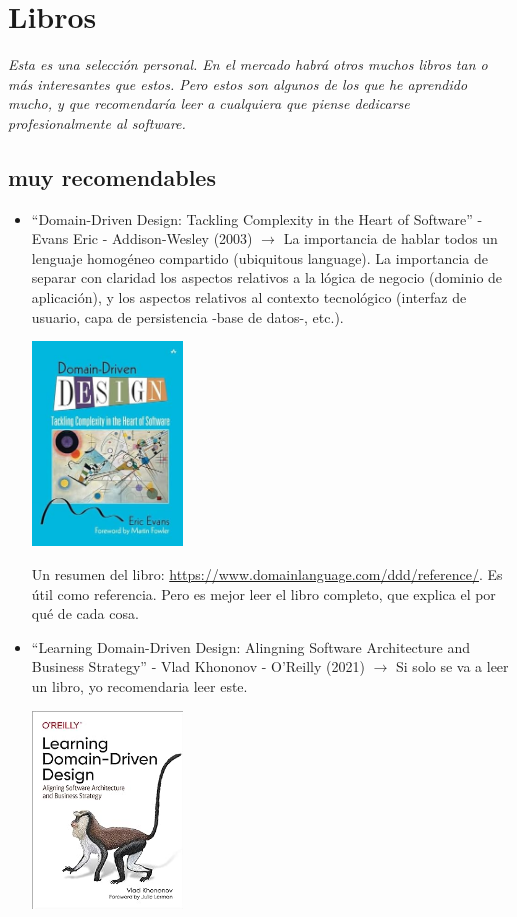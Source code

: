 \documentclass[spanish,12pt,a4paper,final,oneside]{book}
\begin{document}
\chapter{Libros}
\textit{Esta es una selección personal. En el mercado habrá otros muchos libros tan o más interesantes que estos. Pero estos son algunos de los que he aprendido mucho, y que recomendaría leer a cualquiera que piense dedicarse profesionalmente al software.}

\section{muy recomendables}

\begin{itemize}

\item ``Domain-Driven Design: Tackling Complexity in the Heart of Software'' - Evans Eric - Addison-Wesley (2003) $\rightarrow$ La importancia de hablar todos un lenguaje homogéneo compartido (ubiquitous language). La importancia de separar con claridad los aspectos relativos a la lógica de negocio (dominio de aplicación), y los aspectos relativos al contexto tecnológico (interfaz de usuario, capa de persistencia -base de datos-, etc.).

\includegraphics[width=4cm]{portada-DomainDrivenDesign-EricEvans.jpg}

Un resumen del libro: \url{https://www.domainlanguage.com/ddd/reference/}. Es útil como referencia. Pero es mejor leer el libro completo, que explica el por qué de cada cosa.

\item ``Learning Domain-Driven Design: Alingning Software Architecture and Business Strategy'' - Vlad Khononov - O'Reilly (2021) $\rightarrow$ Si solo se va a leer un libro, yo recomendaria leer este.

\includegraphics[width=4cm]{portada-LearningDomainDrivenDesign-Vlad Khononov.jpg}


\end{itemize}
\end{document}
